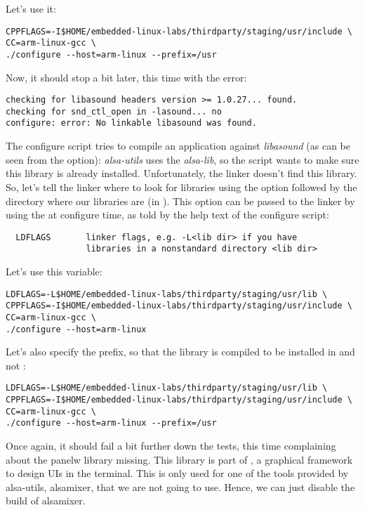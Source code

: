 Let's use it:

\begin{verbatim}
CPPFLAGS=-I$HOME/embedded-linux-labs/thirdparty/staging/usr/include \
CC=arm-linux-gcc \
./configure --host=arm-linux --prefix=/usr
\end{verbatim}

Now, it should stop a bit later, this time with the error:
\begin{verbatim}
checking for libasound headers version >= 1.0.27... found.
checking for snd_ctl_open in -lasound... no
configure: error: No linkable libasound was found.
\end{verbatim}

The configure script tries to compile an application against {\em
  libasound} (as can be seen from the  option): {\em
  alsa-utils} uses the {\em alsa-lib}, so the \code{configure} script
wants to make sure this library is already installed. Unfortunately,
the \code{ld} linker doesn't find this library. So, let's tell the
linker where to look for libraries using the  option followed
by the directory where our libraries are (in
\code{staging/usr/lib}). This \code{-L} option can be passed to the
linker by using the \code{LDFLAGS} at configure time, as told by the
help text of the configure script:

\begin{verbatim}
  LDFLAGS       linker flags, e.g. -L<lib dir> if you have
                libraries in a nonstandard directory <lib dir>
\end{verbatim}

Let's use this  variable:

\begin{verbatim}
LDFLAGS=-L$HOME/embedded-linux-labs/thirdparty/staging/usr/lib \
CPPFLAGS=-I$HOME/embedded-linux-labs/thirdparty/staging/usr/include \
CC=arm-linux-gcc \
./configure --host=arm-linux
\end{verbatim}

Let's also specify the prefix, so that the library is compiled to be
installed in  and not :

\begin{verbatim}
LDFLAGS=-L$HOME/embedded-linux-labs/thirdparty/staging/usr/lib \
CPPFLAGS=-I$HOME/embedded-linux-labs/thirdparty/staging/usr/include \
CC=arm-linux-gcc \
./configure --host=arm-linux --prefix=/usr
\end{verbatim}

Once again, it should fail a bit further down the tests, this time
complaining about the panelw library missing. This library is part of
\code{ncurses}, a graphical framework to design UIs in the
terminal. This is only used for one of the tools provided by
alsa-utils, alsamixer, that we are not going to use. Hence, we can
just disable the build of alsamixer.

